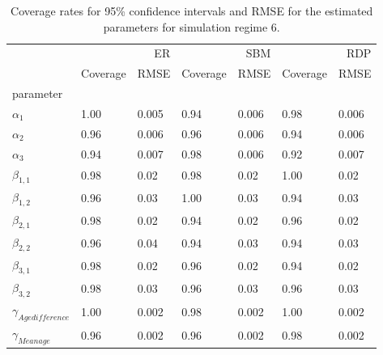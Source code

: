 \begin{table}[ht]
\centering
\caption{Coverage rates for 95\% confidence intervals and RMSE for the estimated parameters for simulation regime 6.}
\label{tab:regime_6_params}
\begin{tabular}{lllllll}
\toprule
 & \multicolumn{2}{r}{ER} & \multicolumn{2}{r}{SBM} & \multicolumn{2}{r}{RDP} \\
 & Coverage & RMSE & Coverage & RMSE & Coverage & RMSE \\
parameter &  &  &  &  &  &  \\
\midrule
$\alpha_{1}$ & 1.00 & 0.005 & 0.94 & 0.006 & 0.98 & 0.006 \\
$\alpha_{2}$ & 0.96 & 0.006 & 0.96 & 0.006 & 0.94 & 0.006 \\
$\alpha_{3}$ & 0.94 & 0.007 & 0.98 & 0.006 & 0.92 & 0.007 \\
$\beta_{1,1}$ & 0.98 & 0.02 & 0.98 & 0.02 & 1.00 & 0.02 \\
$\beta_{1,2}$ & 0.96 & 0.03 & 1.00 & 0.03 & 0.94 & 0.03 \\
$\beta_{2,1}$ & 0.98 & 0.02 & 0.94 & 0.02 & 0.96 & 0.02 \\
$\beta_{2,2}$ & 0.96 & 0.04 & 0.94 & 0.03 & 0.94 & 0.03 \\
$\beta_{3,1}$ & 0.98 & 0.02 & 0.96 & 0.02 & 0.94 & 0.02 \\
$\beta_{3,2}$ & 0.98 & 0.03 & 0.96 & 0.03 & 0.96 & 0.03 \\
$\gamma_{Age difference}$ & 1.00 & 0.002 & 0.98 & 0.002 & 1.00 & 0.002 \\
$\gamma_{Mean age}$ & 0.96 & 0.002 & 0.96 & 0.002 & 0.98 & 0.002 \\
\bottomrule
\end{tabular}

\end{table}
